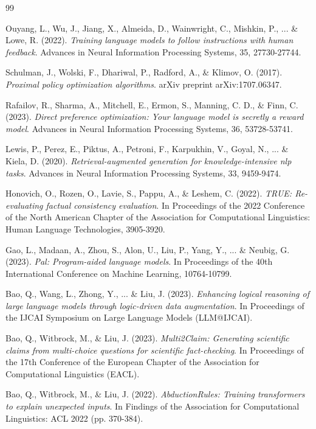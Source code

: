 \begin{thebibliography}{99}

Ouyang, L., Wu, J., Jiang, X., Almeida, D., Wainwright, C., Mishkin, P., ... \& Lowe, R. (2022).
\textit{Training language models to follow instructions with human feedback}.
Advances in Neural Information Processing Systems, 35, 27730-27744.

Schulman, J., Wolski, F., Dhariwal, P., Radford, A., \& Klimov, O. (2017).
\textit{Proximal policy optimization algorithms}.
arXiv preprint arXiv:1707.06347.

Rafailov, R., Sharma, A., Mitchell, E., Ermon, S., Manning, C. D., \& Finn, C. (2023).
\textit{Direct preference optimization: Your language model is secretly a reward model}.
Advances in Neural Information Processing Systems, 36, 53728-53741.

Lewis, P., Perez, E., Piktus, A., Petroni, F., Karpukhin, V., Goyal, N., ... \& Kiela, D. (2020).
\textit{Retrieval-augmented generation for knowledge-intensive nlp tasks}.
Advances in Neural Information Processing Systems, 33, 9459-9474.

Honovich, O., Rozen, O., Lavie, S., Pappu, A., \& Leshem, C. (2022).
\textit{TRUE: Re-evaluating factual consistency evaluation}.
In Proceedings of the 2022 Conference of the North American Chapter of the Association for Computational Linguistics: Human Language Technologies, 3905-3920.

Gao, L., Madaan, A., Zhou, S., Alon, U., Liu, P., Yang, Y., ... \& Neubig, G. (2023).
\textit{Pal: Program-aided language models}.
In Proceedings of the 40th International Conference on Machine Learning, 10764-10799.

Bao, Q., Wang, L., Zhong, Y., ... \& Liu, J. (2023).
\textit{Enhancing logical reasoning of large language models through logic-driven data augmentation}.
In Proceedings of the IJCAI Symposium on Large Language Models (LLM@IJCAI).

Bao, Q., Witbrock, M., \& Liu, J. (2023).
\textit{Multi2Claim: Generating scientific claims from multi-choice questions for scientific fact-checking}.
In Proceedings of the 17th Conference of the European Chapter of the Association for Computational Linguistics (EACL).

Bao, Q., Witbrock, M., \& Liu, J. (2022).
\textit{AbductionRules: Training transformers to explain unexpected inputs}.
In Findings of the Association for Computational Linguistics: ACL 2022 (pp. 370-384).


\end{thebibliography}
